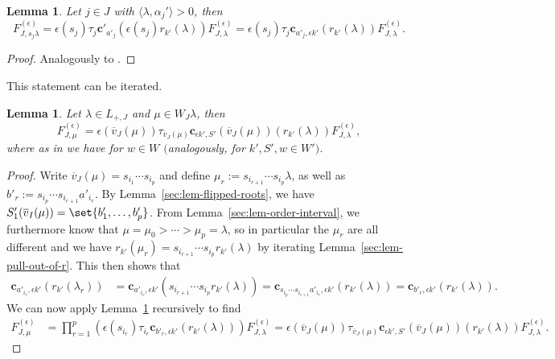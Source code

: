 \documentclass[10pt,a4paper]{amsart}
\newtheorem{Lemma}[Theorem]{Lemma}
\theoremstyle{definition}
\numberwithin{equation}{section}
\begin{document}
\begin{Lemma}\label{sec:lem-relation-within-orbit}
 Let $j\in J$ with $\langle \lambda, \alpha_j'\rangle>0$, then
 \[
 F^{(\epsilon)}_{J,s_j\lambda}
 = \epsilon(s_j) \tau_j \bm{c}'_{a'_j}(\epsilon(s_j)r_{k'}(\lambda))
 F^{(\epsilon)}_{J,\lambda}
 = \epsilon(s_j) \tau_j \bm{c}_{a'_j,\epsilon k'}(r_{k'}(\lambda))
 F^{(\epsilon)}_{J,\lambda}.
 \]
\end{Lemma}
\begin{proof}
 Analogously to \cite[Section~5.7.2]{macdonald}.
\end{proof}

This statement can be iterated.

\begin{Lemma}\label{sec:lem-relation-within-orbit-iterated}
 Let $\lambda\in L_{+,J}$ and $\mu\in W_J\lambda$, then
 \[
 F^{(\epsilon)}_{J,\mu}
 = \epsilon(\overline{v}_J(\mu))
 \tau_{\overline{v}_J(\mu)}
 \bm{c}_{\epsilon k', S'}(\overline{v}_J(\mu))(r_{k'}(\lambda))
 F^{(\epsilon)}_{J,\lambda},
 \]
 where as in {\rm \cite[equation~(4.4.6)]{macdonald}} we have
 for $w\in W$ $($analogously, for $k',S',w\in W')$.
\end{Lemma}
\begin{proof}
 Write $\overline{v}_J(\mu)=s_{i_1}\cdots s_{i_p}$ and define
$
 \mu_r := s_{i_{r+1}}\cdots s_{i_p} \lambda$,
 as well as $b'_r := s_{i_p}\cdots s_{i_{r+1}} a'_{i_r}$. By Lemma~\ref{sec:lem-flipped-roots}, we have
$
 S'_1(\overline{v}_I(\mu)) = \set{b'_1,\dots,b'_p}$.
 From Lemma~\ref{sec:lem-order-interval}, we furthermore know that
$
 \mu = \mu_0 > \cdots > \mu_p = \lambda$,
 so in particular the $\mu_r$ are all different and we have
$
 r_{k'}(\mu_r) = s_{i_{r+1}}\cdots s_{i_p} r_{k'}(\lambda)
$
 by iterating Lemma~\ref{sec:lem-pull-out-of-r}.
 This then shows that
 \begin{align*}
 \bm{c}_{a'_{i_r},\epsilon k'}(r_{k'}(\lambda_r))
 &= \bm{c}_{a'_{i_r}, \epsilon k'}(s_{i_{r+1}}\cdots s_{i_p} r_{k'}(\lambda))= \bm{c}_{s_{i_p}\cdots s_{i_{r+1}} a'_{i_r}, \epsilon k'}(r_{k'}(\lambda))= \bm{c}_{b'_r, \epsilon k'}(r_{k'}(\lambda)).
 \end{align*}
 We can now apply Lemma~\ref{sec:lem-relation-within-orbit} recursively
 to find
 \begin{align*}
 F^{(\epsilon)}_{J,\mu}
 &= \prod_{r=1}^p (\epsilon(s_{i_r}) \tau_{i_r} \bm{c}_{b'_r,\epsilon k'} (r_{k'}(\lambda)))
 F^{(\epsilon)}_{J,\lambda}= \epsilon(\overline{v}_J(\mu)) \tau_{\overline{v}_J(\mu)}
 \bm{c}_{\epsilon k', S'}(\overline{v}_J(\mu))(r_{k'}(\lambda))
 F^{(\epsilon)}_{J,\lambda}.\tag*{\qed}
 \end{align*}\renewcommand{\qed}{}
\end{proof}
\end{document}
